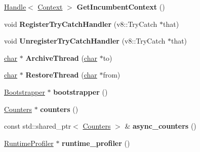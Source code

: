 \begin{DoxyCompactItemize}
\mbox{\hyperlink{classv8_1_1internal_1_1Handle}{Handle}}$<$ \mbox{\hyperlink{classv8_1_1internal_1_1Context}{Context}} $>$ {\bfseries Get\+Incumbent\+Context} ()
\item 
\mbox{\label{classv8_1_1internal_1_1Isolate_af44fbb26816a718884f8e54a6e055c5e}} 
void {\bfseries Register\+Try\+Catch\+Handler} (v8\+::\+Try\+Catch $\ast$that)
\item 
\mbox{\label{classv8_1_1internal_1_1Isolate_a54758a65365a4c4f48a945100b647584}} 
void {\bfseries Unregister\+Try\+Catch\+Handler} (v8\+::\+Try\+Catch $\ast$that)
\item 
\mbox{\label{classv8_1_1internal_1_1Isolate_a89c36ecb5eb634908ff843c0c644417c}} 
\mbox{\hyperlink{classchar}{char}} $\ast$ {\bfseries Archive\+Thread} (\mbox{\hyperlink{classchar}{char}} $\ast$to)
\item 
\mbox{\label{classv8_1_1internal_1_1Isolate_a85401ba29d4f42d80729bb3e98537f95}} 
\mbox{\hyperlink{classchar}{char}} $\ast$ {\bfseries Restore\+Thread} (\mbox{\hyperlink{classchar}{char}} $\ast$from)
\item 
\mbox{\label{classv8_1_1internal_1_1Isolate_afdec8e47c6d178bfb42aa203999cb707}} 
\mbox{\hyperlink{classv8_1_1internal_1_1Bootstrapper}{Bootstrapper}} $\ast$ {\bfseries bootstrapper} ()
\item 
\mbox{\label{classv8_1_1internal_1_1Isolate_a9690b82e4f9b4c8a9160630396cde0b3}} 
\mbox{\hyperlink{classv8_1_1internal_1_1Counters}{Counters}} $\ast$ {\bfseries counters} ()
\item 
\mbox{\label{classv8_1_1internal_1_1Isolate_a0df8dc9e4eb119d45ed068d53277c709}} 
const std\+::shared\+\_\+ptr$<$ \mbox{\hyperlink{classv8_1_1internal_1_1Counters}{Counters}} $>$ \& {\bfseries async\+\_\+counters} ()
\item 
\mbox{\label{classv8_1_1internal_1_1Isolate_a3c9e1c1d2ea87d0e1d1a693918d97799}} 
\mbox{\hyperlink{classv8_1_1internal_1_1RuntimeProfiler}{Runtime\+Profiler}} $\ast$ {\bfseries runtime\+\_\+profiler} ()

\end{DoxyCompactItemize}
